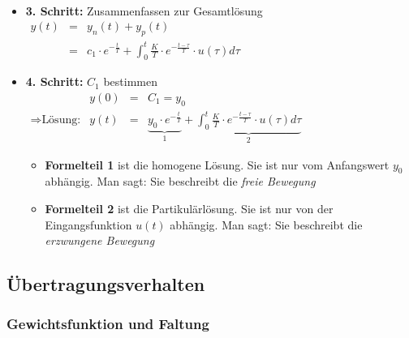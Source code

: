 \message{ !name(Mitschrieb_SysRegel.tex)}\documentclass[12pt,a4paper,ngerman]{scrartcl}
\begin{document}
\begin{itemize}
\begin{math}
\begin{array}{lllllllll}
    \end{array}
  \end{math}
\item \textbf{3. Schritt:} Zusammenfassen zur Gesamtlösung\\
  \begin{math}
    \begin{array}{lll}
      y(t)&=&y_n(t)+y_p(t)\\
          &=&c_1\cdot e^{-\frac{t}{T}}+\int_0^t{\frac{K}{T}\cdot e^{-\frac{t-\tau}{T}}\cdot u(\tau)d\tau}
    \end{array}
  \end{math}
\item \textbf{4. Schritt:} $C_1$ bestimmen\\
  \begin{math}
    \begin{array}{llll}
     &y(0)&=&C_1=y_0\\
     \Rightarrow \text{Lösung:}&y(t)&=&\underbrace{y_0\cdot e^{-\frac{t}{T}}}_{1}+\underbrace{\int_0^t{\frac{K}{T}\cdot e^{-\frac{t-\tau}{T}}\cdot u(\tau)d\tau}}_{2}
    \end{array}
  \end{math}
  \begin{itemize}
  \item \textbf{Formelteil 1} ist die homogene Lösung. Sie ist nur vom Anfangswert $y_0$ abhängig. Man sagt: Sie beschreibt die \emph{freie Bewegung}
  \item \textbf{Formelteil 2} ist die Partikulärlösung. Sie ist nur von der Eingangsfunktion $u(t)$ abhängig. Man sagt: Sie beschreibt die \emph{erzwungene Bewegung}
  \end{itemize}
\end{itemize}

\subsection{Übertragungsverhalten}

\subsubsection{Gewichtsfunktion und Faltung}
\end{document}
